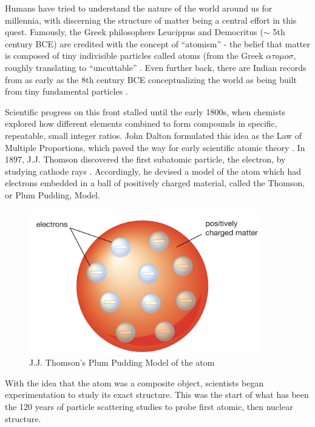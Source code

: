 Humans have tried to understand the nature of the world around us for millennia, with discerning the structure of matter being a central effort in this quest. Famously, the Greek philosophers Leucippus and Democritus ($\sim$ 5th century BCE) are credited with the concept of ``atomism'' - the belief that matter is composed of tiny indivisible particles called atoms (from the Greek $\alpha \tau o \mu o \sigma$, roughly translating to ``uncuttable'' \parencite{Taylor1999Commentary}. Even further back, there are Indian records from as early as the 8th century BCE conceptualizing the world as being built from tiny fundamental particles \parencite{McEvilley2002ThePhilosophies}.

Scientific progress on this front stalled until the early 1800s, when chemists explored how different elements combined to form compounds in specific, repeatable, small integer ratios. John Dalton formulated this idea as the Law of Multiple Proportions, which paved the way for early scientific atomic theory \parencite{Britannica2010LawProportions}. In 1897, J.J. Thomson discovered the first subatomic particle, the electron, by studying cathode rays \parencite{Thomson1901OnAtoms}. Accordingly, he devised a model of the atom which had electrons embedded in a ball of positively charged material, called the Thomson, or Plum Pudding, Model\parencite{Navarro1995AThomson}.

\begin{figure}
    \centering
    \includegraphics[width=0.9\textwidth]{Chapters/Ch1-Intro/Ch1-Sec1-Background/pics/plumbpudding.png}
    \caption[J.J. Thomson's Plum Pudding Model]{J.J. Thomson's Plum Pudding Model of the atom \parencite{Britannica2023ThomsonModel} }
    \label{fig:PlumPudding}
\end{figure}

With the idea that the atom was a composite object, scientists began experimentation to study its exact structure. This was the start of what has been the 120 years of particle scattering studies to probe first atomic, then nuclear structure. 

